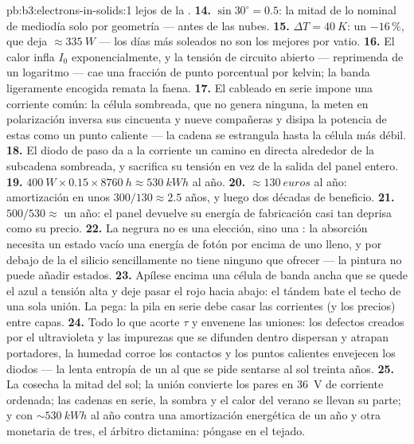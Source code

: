 \begin{solution}{pb:b3:electrons-in-solids:1}
lejos de la .
\textbf{14.} $\sin30^\circ = 0.5$: la mitad de lo nominal de mediodía solo por
geometría --- antes de las nubes.
\textbf{15.} $\Delta T = \qty{40}{K}$: un $-16\,\%$, que deja
$\approx\qty{335}{W}$ --- los días más soleados no son los mejores
por vatio.
\textbf{16.} El calor infla $I_0$ exponencialmente, y la
tensión de circuito abierto --- reprimenda de un logaritmo --- cae una
fracción de punto porcentual por kelvin; la banda ligeramente encogida
remata la faena.
\textbf{17.} El cableado en serie impone una corriente común: la célula
sombreada, que no genera ninguna, la meten en polarización inversa sus
cincuenta y nueve compañeras y disipa la potencia de estas como un punto caliente
--- la cadena se estrangula hasta la célula más débil.
\textbf{18.} El diodo de paso da a la corriente un camino en directa
alrededor de la subcadena sombreada, y sacrifica su tensión en vez de
la salida del panel entero.
\textbf{19.} $\qty{400}{W}\times0.15\times\qty{8760}{h} \approx
\qty{530}{kWh}$ al año.
\textbf{20.} $\approx\qty{130}{euros}$ al año: amortización en
unos $300/130 \approx 2.5$ años, y luego dos décadas de beneficio.
\textbf{21.} $500/530 \approx$ un año: el panel devuelve su
energía de fabricación casi tan deprisa como su precio.
\textbf{22.} La negrura no es una elección, sino una :
la absorción necesita un estado vacío una energía de fotón por encima de uno lleno,
y por debajo de la  el silicio sencillamente no tiene ninguno que ofrecer ---
la pintura no puede añadir estados.
\textbf{23.} Apílese encima una célula de banda ancha que se quede el azul a
tensión alta y deje pasar el rojo hacia abajo: el tándem bate el
techo de una sola unión. La pega: la pila en serie debe casar
las corrientes (y los precios) entre capas.
\textbf{24.} Todo lo que acorte $\tau$ y envenene las uniones:
los defectos creados por el ultravioleta y las impurezas que se difunden dentro dispersan y atrapan
portadores, la humedad corroe los contactos y los puntos calientes envejecen los
diodos --- la lenta entropía de un  al que se pide sentarse al sol
treinta años.
\textbf{25.} La  cosecha la mitad del sol; la unión convierte
los pares en \qty{36}{V} de corriente ordenada; las cadenas en serie,
la sombra y el calor del verano se llevan su parte; y con
$\sim\qty{530}{kWh}$ al año contra una amortización energética de un año y
otra monetaria de tres, el árbitro dictamina: póngase en el tejado.
\end{solution}
